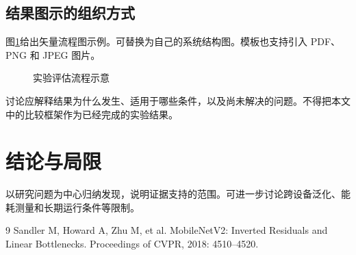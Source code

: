\documentclass[UTF8,fontset=fandol,a4paper,zihao=-4]{ctexart}
\begin{document}
\subsection{结果图示的组织方式}
图\ref{fig:route}给出矢量流程图示例。可替换为自己的系统结构图。模板也支持引入 PDF、PNG 和 JPEG 图片。
\begin{figure}[htbp]\centering
{}
\caption{实验评估流程示意}\label{fig:route}
\end{figure}
\begin{summarybox}[写作提示]
讨论应解释结果为什么发生、适用于哪些条件，以及尚未解决的问题。不得把本文中的比较框架作为已经完成的实验结果。
\end{summarybox}
\section{结论与局限}
以研究问题为中心归纳发现，说明证据支持的范围。可进一步讨论跨设备泛化、能耗测量和长期运行条件等限制。
\begin{thebibliography}{9}
 Sandler M, Howard A, Zhu M, et al. MobileNetV2: Inverted Residuals and Linear Bottlenecks. Proceedings of CVPR, 2018: 4510--4520.
\end{thebibliography}
\end{document}

